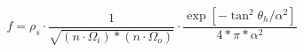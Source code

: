 \begin{equation}
     f = {{\rho_{s}}
     	\cdot{
        	\frac{1}{ \sqrt{ ({n}\cdot{\Omega_{i}}) * ({n}\cdot{\Omega_{o}}) } } } }
        \cdot{ \frac{ \exp[-\tan^{2}{\theta_{h}} / \alpha^2] }{ 4*\pi*\alpha^2} }
\end{equation}